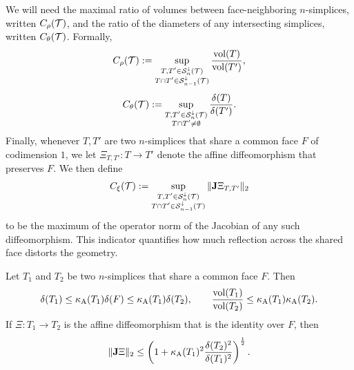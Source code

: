 \documentclass[10pt,a4paper]{article}
\begin{document}
We will need the maximal ratio of volumes between face-neighboring $n$-simplices, written $C_\rho({\mathcal T})$,
and the ratio of the diameters of any intersecting simplices, written $C_\theta({\mathcal T})$. Formally, 
\begin{align}\label{math:volumeratio}
    C_\rho({\mathcal T}) 
    := 
    \sup_{ \substack{ T, T' \in {\mathcal S}^{\downarrow}_{n}({\mathcal T}) \\ T \cap T' \in {\mathcal S}^{\downarrow}_{n-1}({\mathcal T}) } } 
    \frac{ \operatorname{vol}(T) }{ \operatorname{vol}(T') }
    ,
\end{align}
\begin{align}\label{math:diameterratio}
    C_\theta({\mathcal T}) 
    := 
    \sup_{ \substack{ T, T' \in {\mathcal S}^{\downarrow}_{n}({\mathcal T}) \\ T \cap T' \neq \emptyset } }
    \frac{ {\delta}(T) }{ {\delta}(T') }
    .
\end{align}
Finally, whenever $T, T'$ are two $n$-simplices that share a common face $F$ of codimension $1$, we let $\Xi_{T,T'} : T \rightarrow T'$ denote the affine diffeomorphism 
that preserves $F$. We then define 
\begin{align}\label{math:reflectionmeasure}
    C_\xi({\mathcal T}) 
    := 
    \sup_{ \substack{ T, T' \in {\mathcal S}^{\downarrow}_{n}({\mathcal T}) \\ T \cap T' \in {\mathcal S}^{\downarrow}_{n-1}({\mathcal T}) } }
    \|  {\mathbf{J}} \Xi_{T,T'}  \|_{2}
\end{align}
to be the maximum of the operator norm of the Jacobian of any such diffeomorphism. 
This indicator quantifies how much reflection across the shared face distorts the geometry. 

\begin{lemma}\label{lemma:volumecomparison}
    Let $T_1$ and $T_2$ be two $n$-simplices that share a common face $F$. Then 
    \begin{align*}
        {\delta}(T_1)
        \leq 
        \kappa_{\rm A}(T_1)
        {\delta}(F)
        \leq 
        \kappa_{\rm A}(T_1)
        {\delta}(T_2)
        ,
        \qquad 
        \frac{ \operatorname{vol}(T_1) }{ \operatorname{vol}(T_2) }
        \leq 
        \kappa_{\rm A}(T_1) \kappa_{\rm A}(T_2)
        .
    \end{align*}
    If $\Xi : T_1 \rightarrow T_2$ is the affine diffeomorphism that is the identity over $F$, then 
    \begin{align*}
        \|  {\mathbf{J}} \Xi  \|_{2}
        \leq 
        \left( 1 + \kappa_{\rm A}(T_1)^2 \frac{{\delta}(T_2)^2}{{\delta}(T_1)^2} \right)^{\frac 1 2}
        .
    \end{align*}
\end{lemma}
\end{document}
